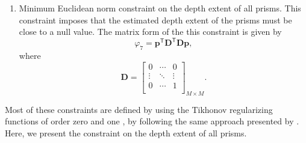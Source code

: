 \begin{enumerate}
\item Minimum Euclidean norm constraint on the depth extent of all prisms. This constraint imposes that the estimated depth extent of the prisms must be close to a null value. The matrix form of the this constraint is given by
\begin{equation}\label{eq:phi7}
\varphi_7 = \mathbf{p}^\mathsf{T}\mathbf{D}^\mathsf{T}\mathbf{D}\mathbf{p},
\end{equation}
where
\begin{equation}
\mathbf{D} =
\begin{bmatrix}
 0 & \cdots  & 0 \\
 \vdots & \ddots & \vdots\\
 0  & \cdots  & 1\\
\end{bmatrix}_{M\times M}.
\end{equation}

\end{enumerate}

Most of these constraints are defined by using the Tikhonov regularizing functions of order zero and one \citep{aster-etal2019}, by following the same approach presented by \citet{oliveirajr-etal2011}. Here, we present the constraint on the depth extent of all prisms.